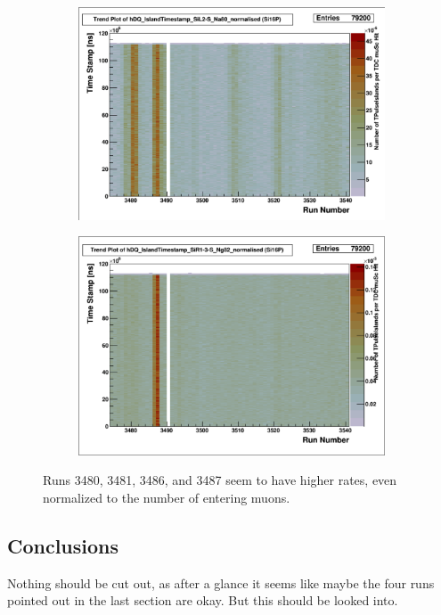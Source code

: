\documentclass[a4paper]{article}
\begin{document}
\begin{figure}
  \centering
  \begin{subfigure}{0.5\textwidth}
    \includegraphics[width=0.9\linewidth]{figs/si16p/sil2s_timestamp}
  \end{subfigure}%
  \begin{subfigure}{0.5\textwidth}
    \includegraphics[width=0.9\linewidth]{figs/si16p/sir13s_timestamp}
  \end{subfigure}
  \caption{Runs 3480, 3481, 3486, and 3487 seem to have higher rates, even normalized to the number of entering muons.}
  \label{fig:si16p_funnyruns}
\end{figure}


\subsection{Conclusions}

Nothing should be cut out, as after a glance it seems like maybe the four runs pointed out in the last section are okay.
But this should be looked into.
\end{document}
